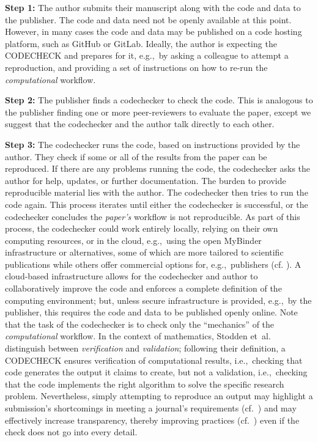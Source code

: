 \documentclass[12pt]{article}
\newcommand{\rev}[1]{\textit{#1}}
\begin{document}
\textbf{Step 1:} The author submits their manuscript along with the
code and data to the publisher.  The code and data need not be openly
available at this point.  However, in many cases the code and data may
be published on a code hosting platform, such as GitHub or
GitLab. Ideally, the author is expecting the CODECHECK and prepares
for it, e.g.,~by asking a colleague to attempt a reproduction, and
providing a set of instructions on how to re-run the \rev{computational} workflow.

\textbf{Step 2:} The publisher finds a codechecker to check the
code. This is analogous to the publisher finding one or more
peer-reviewers to evaluate the paper, except we suggest that the
codechecker and the author talk directly to each other.

\textbf{Step 3:} The codechecker runs the code, based on instructions
provided by the author. They check if some or all of the results from
the paper can be reproduced. If there are any problems running the
code, the codechecker asks the author for help, updates, or further
documentation.  The burden to provide reproducible material lies with
the author.  The codechecker then tries to run the code again.  This
process iterates until either the codechecker is successful, or the
codechecker concludes the \rev{paper's} workflow is not reproducible.  As part of
this process, the codechecker could work entirely locally, relying on
their own computing resources, or in the cloud, e.g.,~using the open
MyBinder infrastructure \cite{jupyter_binder_2018} or alternatives,
some of which are more tailored to scientific publications while
others offer commercial options for, e.g.,~publishers
(cf. \cite{konkol_publishing_2020}).  A cloud-based infrastructure
allows for the codechecker and author to collaboratively improve the
code and enforces a complete definition of the computing environment;
but, unless secure infrastructure is provided, e.g.,~by the publisher,
this requires the code and data to be published openly online.  Note
that the task of the codechecker is to check only the ``mechanics'' of the
\rev{computational} workflow.  In the context of
mathematics, Stodden et~al. \cite{stodden_setting_2013} distinguish
between \emph{verification} and \emph{validation}; following their
definition, a CODECHECK ensures verification
of computational results, i.e.,~checking that code generates the
output it claims to create, but not a validation, i.e.,~checking that
the code implements the right algorithm to solve the specific research
problem.  Nevertheless, simply attempting to reproduce an output may
highlight a submission's shortcomings in meeting a journal's
requirements (cf.~\cite{christian_journal_2020}) and may effectively
increase transparency, thereby improving practices
(cf.~\cite{nosek_scientific_2012}) even if the check does not go into
every detail.
\end{document}
